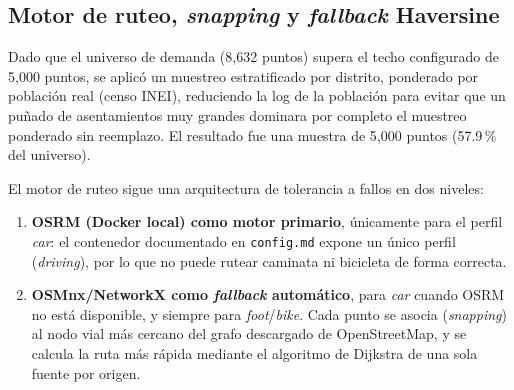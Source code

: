 \documentclass[11pt]{article}
\begin{document}
\subsection{Motor de ruteo, \textit{snapping} y \textit{fallback} Haversine}

Dado que el universo de demanda (8{,}632 puntos) supera el techo
configurado de 5{,}000 puntos, se aplicó un muestreo estratificado por
distrito, ponderado por población real (censo INEI), reduciendo la log de
la población para evitar que un puñado de asentamientos muy grandes
dominara por completo el muestreo ponderado sin reemplazo. El resultado fue
una muestra de 5{,}000 puntos (57.9\,\% del universo).

El motor de ruteo sigue una arquitectura de tolerancia a fallos en dos
niveles:

\begin{enumerate}
  \item \textbf{OSRM (Docker local) como motor primario}, únicamente para
    el perfil \textit{car}: el contenedor documentado en
    \texttt{config.md} expone un único perfil (\textit{driving}), por lo
    que no puede rutear caminata ni bicicleta de forma correcta.
  \item \textbf{OSMnx/NetworkX como \textit{fallback} automático}, para
    \textit{car} cuando OSRM no está disponible, y siempre para
    \textit{foot}/\textit{bike}. Cada punto se asocia (\textit{snapping})
    al nodo vial más cercano del grafo descargado de OpenStreetMap, y se
    calcula la ruta más rápida mediante el algoritmo de Dijkstra de una
    sola fuente por origen.
\end{enumerate}
\end{document}
